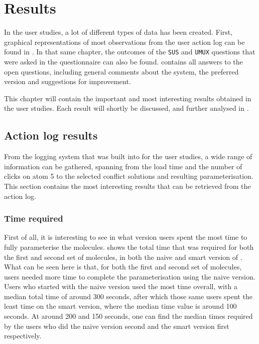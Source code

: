\chapter{Results}

In the user studies, a lot of different types of data has been created. First, graphical representations of most observations from the user action log can be found in . In that same chapter, the outcomes of the \verb|SUS| and \verb|UMUX| questions that were asked in the questionnaire can also be found.  contains all answers to the open questions, including general comments about the system, the preferred version and suggestions for improvement.

This chapter will contain the important and most interesting results obtained in the user studies. Each result will shortly be discussed, and further analysed in .


\section{Action log results}
From the logging system that was built into \oframp{} for the user studies, a wide range of information can be gathered, spanning from the load time and the number of clicks on atom 5 to the selected conflict solutions and resulting parameterisation. This section contains the most interesting results that can be retrieved from the action log.

\subsection{Time required}
First of all, it is interesting to see in what version users spent the most time to fully parameterise the molecules.  shows the total time that was required for both the first and second set of molecules, in both the naive and smart version of \oframp. What can be seen here is that, for both the first and second set of molecules, users needed more time to complete the parameterisation using the naive version. Users who started with the naive version used the most time overall, with a median total time of around 300 seconds, after which those same users spent the least time on the smart version, where the median time value is around 100 seconds. At around 200 and 150 seconds, one can find the median times required by the users who did the naive version second and the smart version first respectively.

